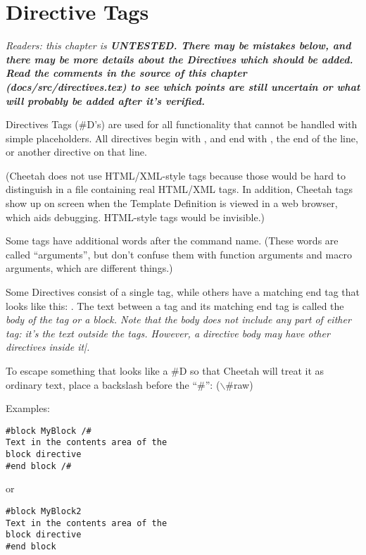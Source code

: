 \section{Directive Tags}

\em{Readers: this chapter is \bf{UNTESTED}.  There may be mistakes below, and
there may be more details about the Directives which should be added.  Read the
comments in the source of this chapter (docs/src/directives.tex) to see which
points are still uncertain or what will probably be added after it's verified.}


Directives Tags (\#D's) are used for all functionality that cannot be handled
with simple placeholders.  All directives begin with \code{\#}, and end with
\code{/\#}, the end of the line, or another directive on that line.  

(Cheetah does not use HTML/XML-style tags because those would be hard to 
distinguish in a file containing real HTML/XML tags.  In addition, Cheetah tags
show up on screen when the Template Definition is viewed in a web browser,
which aids debugging.  HTML-style tags would be invisible.)

Some tags have additional words after the
command name.  (These words are called ``arguments'', but don't confuse them
with function arguments and macro arguments, which are different things.)


Some Directives consist of a single tag, while others have a matching end tag
that looks like this: .  The text between a tag and
its matching end tag is called the \em{body} of the tag or a \em{block}.  Note
that the body does not include any part of either tag: it's the text
\em{outside} the tags.  However, a directive body may have other directives
inside \em{it|}.

To escape something that looks like a \#D so that Cheetah will treat it as
ordinary text, place a backslash before the ``\#'':
($\backslash$\#raw) 

Examples:

\begin{verbatim}
#block MyBlock /#
Text in the contents area of the
block directive
#end block /#
\end{verbatim}
or
\begin{verbatim}
#block MyBlock2
Text in the contents area of the
block directive
#end block
\end{verbatim}

